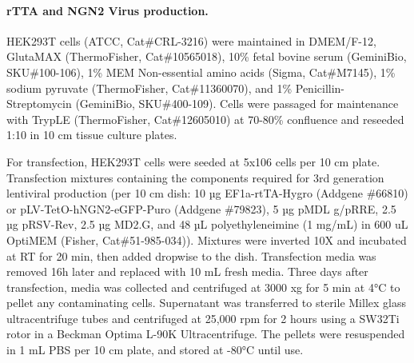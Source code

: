 \documentclass[12pt]{article}
\begin{document}
\paragraph{rTTA and NGN2 Virus production.}
HEK293T cells (ATCC, Cat\#CRL-3216) were maintained in DMEM/F-12, GlutaMAX (ThermoFisher, Cat\#10565018), 10\% fetal bovine serum (GeminiBio, SKU\#100-106), 1\% MEM Non-essential amino acids (Sigma, Cat\#M7145), 1\% sodium pyruvate (ThermoFisher, Cat\#11360070), and 1\% Penicillin-Streptomycin (GeminiBio, SKU\#400-109). Cells were passaged for maintenance with TrypLE (ThermoFisher, Cat\#12605010) at 70-80\% confluence and reseeded 1:10 in 10 cm tissue culture plates.

For transfection, HEK293T cells were seeded at 5x106 cells per 10 cm plate. Transfection mixtures containing the components required for 3rd generation lentiviral production (per 10 cm dish: 10 µg EF1a-rtTA-Hygro (Addgene \#66810) or pLV-TetO-hNGN2-eGFP-Puro (Addgene \#79823), 5 µg pMDL g/pRRE, 2.5 µg pRSV-Rev, 2.5 µg MD2.G, and 48 µL polyethyleneimine (1 mg/mL) in 600 uL OptiMEM (Fisher, Cat\#51-985-034)). Mixtures were inverted 10X and incubated at RT for 20 min, then added dropwise to the dish. Transfection media was removed 16h later and replaced with 10 mL fresh media. Three days after transfection, media was collected and centrifuged at 3000 xg for 5 min at 4°C to pellet any contaminating cells. Supernatant was transferred to sterile Millex glass ultracentrifuge tubes and centrifuged at 25,000 rpm for 2 hours using a SW32Ti rotor in a Beckman Optima L-90K Ultracentrifuge. The pellets were resuspended in 1 mL PBS per 10 cm plate, and stored at -80°C until use.
\end{document}

